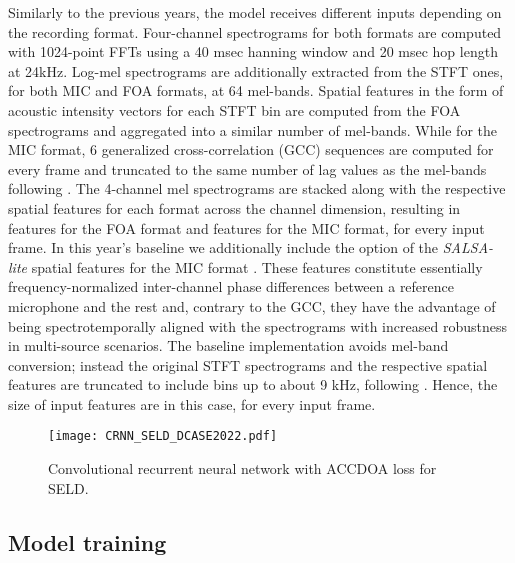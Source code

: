 \documentclass{article}
\begin{document}
\begin{sloppy}
Similarly to the previous years, the model receives different inputs depending on the recording format. Four-channel spectrograms for both formats are computed with 1024-point FFTs using a 40 msec hanning window and 20 msec hop length at 24kHz. Log-mel spectrograms are additionally extracted from the STFT ones, for both MIC and FOA formats, at 64 mel-bands. Spatial features in the form of acoustic intensity vectors for each STFT bin are computed from the FOA spectrograms and aggregated into a similar number of mel-bands. While for the MIC format, 6 generalized cross-correlation (GCC) sequences are computed for every frame and truncated to the same number of lag values as the mel-bands following \cite{Cao2019}. The 4-channel mel spectrograms are stacked along with the respective spatial features for each format across the channel dimension, resulting in  features for the FOA format and  features for the MIC format, for every input frame. In this year's baseline we additionally include the option of the \emph{SALSA-lite} spatial features for the MIC format \cite{nguyen2022salsa}. These features constitute essentially frequency-normalized inter-channel phase differences between a reference microphone and the rest and, contrary to the GCC, they have the advantage of being spectrotemporally aligned with the spectrograms with increased robustness in multi-source scenarios. The baseline implementation avoids mel-band conversion; instead the original STFT spectrograms and the respective spatial features are truncated to include bins up to about 9 kHz, following \cite{nguyen2022salsa}. Hence, the size of input features are  in this case, for every input frame. 

\begin{figure}[t]
  \centering
  \centerline{\texttt{[image: CRNN\_SELD\_DCASE2022.pdf]}} 
  \caption{Convolutional recurrent neural network with ACCDOA loss for SELD.}
  \label{fig:crnn}
\end{figure}

\subsection{Model training}
\label{sec:model_training}


\end{sloppy}
\end{document}
